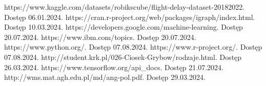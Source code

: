\begin{thebibliography}{4}
     https://www.kaggle.com/datasets/robikscube/flight-delay-dataset-20182022. Dostęp 06.01.2024.
     https://cran.r-project.org/web/packages/igraph/index.html. Dostęp 10.03.2024.
     https://developers.google.com/machine-learning. Dostęp 20.07.2024.
     https://www.ibm.com/topics. Dostęp 20.07.2024.
     https://www.python.org/. Dostęp 07.08.2024.
     https://www.r-project.org/. Dostęp 07.08.2024.
     http://student.krk.pl/026-Ciosek-Grybow/rodzaje.html. Dostęp 26.03.2024.
     https://www.tensorflow.org/api\_docs. Dostęp 21.07.2024.
     http://wms.mat.agh.edu.pl/\texttildelow md/ang-pol.pdf. Dostęp 29.03.2024.
\end{thebibliography}
